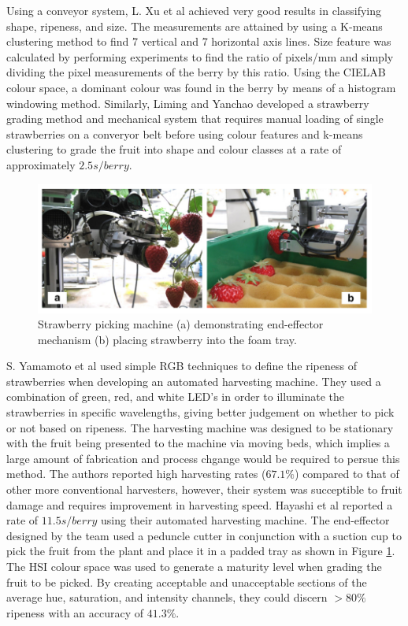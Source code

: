 \documentclass[fleqn,twoside]{article}
\begin{document}
Using a conveyor system, L. Xu et al \cite{xu} achieved very good results in classifying shape, ripeness, and size. The measurements are attained by using a K-means clustering method to find 7 vertical and 7 horizontal axis lines. Size feature was calculated by performing experiments to find the ratio of pixels/mm and simply dividing the pixel measurements of the berry by this ratio. Using the CIELAB colour space, a dominant colour was found in the berry by means of a histogram windowing method. Similarly, Liming and Yanchao \cite{liming} developed a strawberry grading method and mechanical system that requires manual loading of single strawberries on a converyor belt before using colour features and k-means clustering to grade the fruit into shape and colour classes at a rate of approximately $2.5s/berry$. 


\begin{figure}[h]
	\centering
	\includegraphics[width=0.9\linewidth]{strawberry_picker.png}
	\caption{Strawberry picking machine (a) demonstrating end-effector mechanism (b) placing strawberry into the foam tray.}
	\label{fig:strawberry_picker}
\end{figure}%


S. Yamamoto et al \cite{yamamoto2} used simple RGB techniques to define the ripeness of strawberries when developing an automated harvesting machine. They used a combination of green, red, and white LED's in order to illuminate the strawberries in specific wavelengths, giving better judgement on whether to pick or not based on ripeness. The harvesting machine was designed to be stationary with the fruit being presented to the machine via moving beds, which implies a large amount of fabrication and process chgange would be required to persue this method. The authors reported high harvesting rates ($67.1\%$) compared to that of other more conventional harvesters, however, their system was succeptible to fruit damage and requires improvement in harvesting speed. Hayashi et al \cite{hayashi} reported a rate of $11.5s/berry$ using their automated harvesting machine. The end-effector designed by the team used a peduncle cutter in conjunction with a suction cup to pick the fruit from the plant and place it in a padded tray as shown in Figure \ref{fig:strawberry_picker}. The HSI colour space was used to generate a maturity level when grading the fruit to be picked. By creating acceptable and unacceptable sections of the average hue, saturation, and intensity channels, they could discern $>80\%$ ripeness with an accuracy of $41.3\%$.
\end{document}
